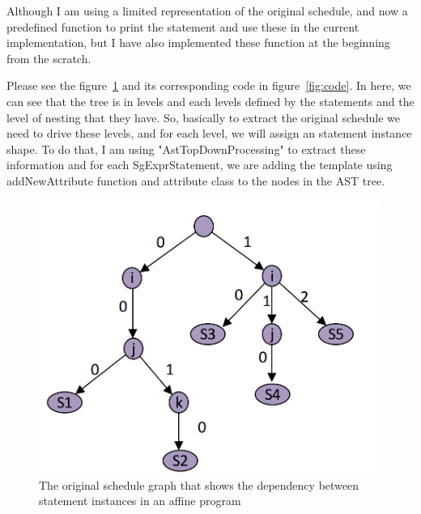 \documentclass[letterpaper,12pt]{article}
\begin{document}
Although I am using a limited representation of the original schedule, and now a predefined function to print the statement and use these in the current implementation, but I have also implemented these function at the beginning from the scratch. 

Please see the figure~\ref{fig:graph} and its corresponding code in figure~\ref{fig:code}. In here, we can see that the tree is in levels and each levels defined by the statements and the level of nesting that they have. So, basically to extract the original schedule we need to drive these levels, and for each level, we will assign an statement instance shape. To do that, I am using "AstTopDownProcessing" to extract these information and for each SgExprStatement, we are adding the template using addNewAttribute function and attribute class to the nodes in the AST tree.


\begin{figure}[h!]
	\centering
	\includegraphics[scale=0.25]{fig/graph.png}
	\caption{The original schedule graph that shows the dependency between statement instances in an affine program}
	\label{fig:graph}
\end{figure}
\end{document}
